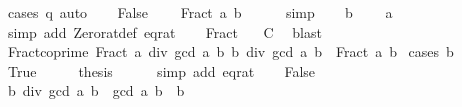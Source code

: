 \begin{isabellebody}
\ {\isacharparenleft}{\kern0pt}cases\ q{\isacharparenright}{\kern0pt}\ auto\isanewline
\ \ \isamarkupfalse%
\ False\ \isamarkupfalse%
\ {\isachardoublequoteopen}{}\ {\isasymnoteq}\ Fract\ a\ b{\isachardoublequoteclose}\isanewline
\ \ \ \ \isamarkupfalse%
\ simp\isanewline
\ \ \isamarkupfalse%
\ {\isacartoucheopen}b\ {\isachargreater}{\kern0pt}\ {}{\isacartoucheclose}\ \isamarkupfalse%
\ {\isachardoublequoteopen}a\ {\isasymnoteq}\ {}{\isachardoublequoteclose}\isanewline
\ \ \ \ \isamarkupfalse%
\ {\isacharparenleft}{\kern0pt}simp\ add{\isacharcolon}{\kern0pt}\ Zero{\isacharunderscore}{\kern0pt}rat{\isacharunderscore}{\kern0pt}def\ eq{\isacharunderscore}{\kern0pt}rat{\isacharparenright}{\kern0pt}\isanewline
\ \ \isamarkupfalse%
\ Fract\ {\isacharasterisk}{\kern0pt}\ \isamarkupfalse%
\ C\ \isamarkupfalse%
\ blast\isanewline
{}\isamarkupfalse%
%
\endisatagproof
{\isafoldproof}%
%
\isadelimproof
%
\endisadelimproof
%
\isadelimdocument
%
\endisadelimdocument
%
\isatagdocument
%
\isamarkuptrue%
%
\endisatagdocument
{\isafolddocument}%
%
\isadelimdocument
%
\endisadelimdocument
{}\isamarkupfalse%
\ Fract{\isacharunderscore}{\kern0pt}coprime{\isacharcolon}{\kern0pt}\ {\isachardoublequoteopen}Fract\ {\isacharparenleft}{\kern0pt}a\ div\ gcd\ a\ b{\isacharparenright}{\kern0pt}\ {\isacharparenleft}{\kern0pt}b\ div\ gcd\ a\ b{\isacharparenright}{\kern0pt}\ {\isacharequal}{\kern0pt}\ Fract\ a\ b{\isachardoublequoteclose}\isanewline
%
\isadelimproof
%
\endisadelimproof
%
\isatagproof
{}\isamarkupfalse%
\ {\isacharparenleft}{\kern0pt}cases\ {\isachardoublequoteopen}b\ {\isacharequal}{\kern0pt}\ {}{\isachardoublequoteclose}{\isacharparenright}{\kern0pt}\isanewline
\ \ \isamarkupfalse%
\ True\isanewline
\ \ \isamarkupfalse%
\ \isamarkupfalse%
\ {\isacharquery}{\kern0pt}thesis\isanewline
\ \ \ \ \isamarkupfalse%
\ {\isacharparenleft}{\kern0pt}simp\ add{\isacharcolon}{\kern0pt}\ eq{\isacharunderscore}{\kern0pt}rat{\isacharparenright}{\kern0pt}\isanewline
{}\isamarkupfalse%
\isanewline
\ \ \isamarkupfalse%
\ False\isanewline
\ \ \isamarkupfalse%
\ \isamarkupfalse%
\ {\isachardoublequoteopen}b\ div\ gcd\ a\ b\ {\isacharasterisk}{\kern0pt}\ gcd\ a\ b\ {\isacharequal}{\kern0pt}\ b{\isachardoublequoteclose}\isanewline

\end{isabellebody}
